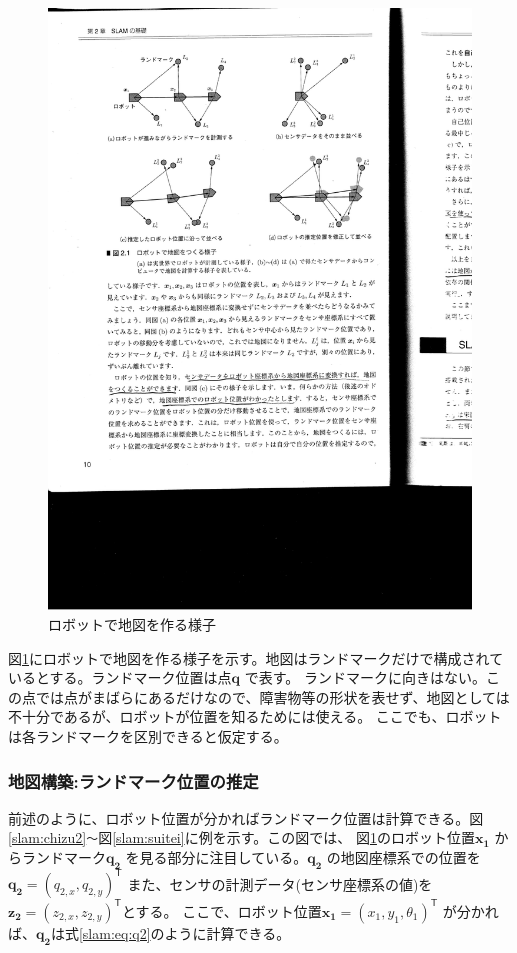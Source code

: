 \begin{figure}[h]
  \begin{center}
  \includegraphics[width=\linewidth]{img/slam_5.pdf}
  \caption{ロボットで地図を作る様子\cite{slam:nyumon}}
  \label{slam:chizu1}
  \end{center}
\end{figure}

図\ref{slam:chizu1}にロボットで地図を作る様子を示す。地図はランドマークだけで構成されているとする。ランドマーク位置は点$\bm{q}$ で表す。
ランドマークに向きはない。この点では点がまばらにあるだけなので、障害物等の形状を表せず、地図としては不十分であるが、ロボットが位置を知るためには使える。
ここでも、ロボットは各ランドマークを区別できると仮定する。

\subsubsection{地図構築:ランドマーク位置の推定}
前述のように、ロボット位置が分かればランドマーク位置は計算できる。図\ref{slam:chizu2}\verb|～|図\ref{slam:suitei}に例を示す。この図では、
図\ref{slam:chizu1}のロボット位置$\bm{x_1}$ からランドマーク$\bm{q_2}$ を見る部分に注目している。$\bm{q_2}$ の地図座標系での位置を
$\bm{q_2}=(q_{2,x},q_{2,y})^{\mathsf{T}}$ また、センサの計測データ(センサ座標系の値)を$\bm{z_2} = (z_{2,x},z_{2,y})^{\mathsf{T}}$とする。
ここで、ロボット位置$\bm{x_1} = (x_1, y_1,\theta_1)^{\mathsf{T}}$ が分かれば、$\bm{q_2}$は式\eqref{slam:eq:q2}のように計算できる。

